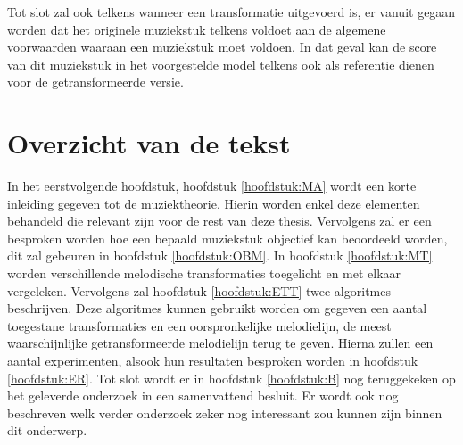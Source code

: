 Tot slot zal ook telkens wanneer een transformatie uitgevoerd is, er vanuit gegaan worden dat het originele muziekstuk telkens voldoet aan de algemene voorwaarden waaraan een muziekstuk moet voldoen. In dat geval kan de score van dit muziekstuk in het voorgestelde model telkens ook als referentie dienen voor de getransformeerde versie. 

\section{Overzicht van de tekst}
In het eerstvolgende hoofdstuk, hoofdstuk \ref{hoofdstuk:MA} wordt een korte inleiding gegeven tot de muziektheorie. Hierin worden enkel deze elementen behandeld die relevant zijn voor de rest van deze thesis. Vervolgens zal er een besproken worden hoe een bepaald muziekstuk objectief kan beoordeeld worden, dit zal gebeuren in hoofdstuk \ref{hoofdstuk:OBM}. In hoofdstuk \ref{hoofdstuk:MT} worden verschillende melodische transformaties toegelicht en met elkaar vergeleken. Vervolgens zal hoofdstuk \ref{hoofdstuk:ETT} twee algoritmes beschrijven. Deze algoritmes kunnen gebruikt worden om gegeven een aantal toegestane transformaties en een oorspronkelijke melodielijn, de meest waarschijnlijke getransformeerde melodielijn terug te geven. Hierna zullen een aantal experimenten, alsook hun resultaten besproken worden in hoofdstuk \ref{hoofdstuk:ER}. Tot slot wordt er in hoofdstuk \ref{hoofdstuk:B} nog teruggekeken op het geleverde onderzoek in een samenvattend besluit. Er wordt ook nog beschreven welk verder onderzoek zeker nog interessant zou kunnen zijn binnen dit onderwerp. 

